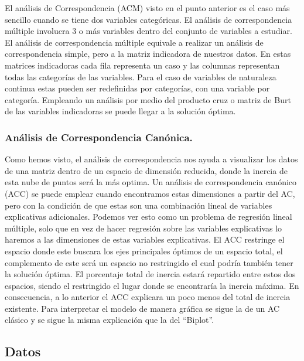 El análisis de Correspondencia (ACM) visto en el punto anterior es el
caso más sencillo cuando se tiene dos variables categóricas. El análisis
de correspondencia múltiple involucra 3 o más variables dentro del
conjunto de variables a estudiar. El análisis de correspondencia
múltiple equivale a realizar un análisis de correspondencia simple, pero
a la matriz indicadora de nuestros datos. En estas matrices indicadoras
cada fila representa un caso y las columnas representan todas las
categorías de las variables. Para el caso de variables de naturaleza
continua estas pueden ser redefinidas por categorías, con una variable
por categoría. Empleando un análisis por medio del producto cruz o
matriz de Burt de las variables indicadoras se puede llegar a la
solución óptima.

\hypertarget{anuxe1lisis-de-correspondencia-canuxf3nica.}{%
\subsubsection{Análisis de Correspondencia
Canónica.}\label{anuxe1lisis-de-correspondencia-canuxf3nica.}}

Como hemos visto, el análisis de correspondencia nos ayuda a visualizar
los datos de una matriz dentro de un espacio de dimensión reducida,
donde la inercia de esta nube de puntos será la más optima. Un análisis
de correspondencia canónico (ACC) se puede emplear cuando encontramos
estas dimensiones a partir del AC, pero con la condición de que estas
son una combinación lineal de variables explicativas adicionales.
Podemos ver esto como un problema de regresión lineal múltiple, solo que
en vez de hacer regresión sobre las variables explicativas lo haremos a
las dimensiones de estas variables explicativas. El ACC restringe el
espacio donde este buscara los ejes principales óptimos de un espacio
total, el complemento de este será un espacio no restringido el cual
podría también tener la solución óptima. El porcentaje total de inercia
estará repartido entre estos dos espacios, siendo el restringido el
lugar donde se encontraría la inercia máxima. En consecuencia, a lo
anterior el ACC explicara un poco menos del total de inercia existente.
Para interpretar el modelo de manera gráfica se sigue la de un AC
clásico y se sigue la misma explicación que la del ``Biplot''.

\hypertarget{datos}{%
\subsection{Datos}\label{datos}}



\address{%
William F. Tandazo-Vargas\\
ESPOL\\%
line 1\\ line 2\\
%
%
%
\\\href{mailto:wtandazo@espol.edu.ec}{\nolinkurl{wtandazo@espol.edu.ec}}
}
